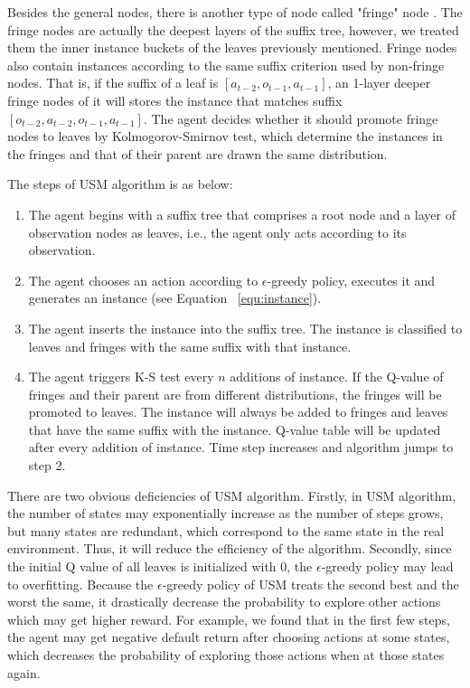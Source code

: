 \documentclass{article}
\begin{document}
Besides the general nodes, there is another type of node called "fringe" node \cite{mccallum1995instance}.
The fringe nodes are actually the deepest layers of the suffix tree, however, we treated them
the inner instance buckets of the leaves previously mentioned. Fringe nodes also contain
instances according to the same suffix criterion used by non-fringe nodes. That is, 
if the suffix of a leaf is $[a_{t-2}, o_{t-1}, a_{t-1}]$, an 1-layer deeper fringe nodes of it
will stores the instance that matches suffix $[o_{t-2}, a_{t-2}, o_{t-1}, a_{t-1}]$. The agent decides
whether it should promote fringe nodes to leaves by Kolmogorov-Smirnov test, which determine the
instances in the fringes and that of their parent are drawn the same distribution.

The steps of USM algorithm is as below:

\begin{enumerate}
  \item The agent begins with a suffix tree that comprises a root node and a layer of
  observation nodes as leaves, i.e., the agent only acts according to its observation.

  \item The agent chooses an action according to $\epsilon$-greedy policy, executes it and
  generates an instance (see Equation ~\ref{equ:instance}).

  \item The agent inserts the instance into the suffix tree. The instance is classified to
  leaves and fringes with the same suffix with that instance. 

  \item The agent triggers K-S test every $n$ additions of instance. If the Q-value of fringes
  and their parent are from different distributions, the fringes will be promoted to leaves.
  The instance will always be added to fringes and leaves that have the same suffix with the instance.
  Q-value table will be updated after every addition of instance. Time step increases and algorithm
  jumps to step 2.
\end{enumerate}

There are two obvious deficiencies of USM algorithm. Firstly, in USM algorithm,
the number of states may exponentially increase as the number of steps grows, but many
states are redundant, which correspond to the same state in the real environment. Thus, it
will reduce the efficiency of the algorithm. Secondly, since the initial Q value of all leaves
is initialized with 0, the $\epsilon$-greedy policy may lead to overfitting. Because
the $\epsilon$-greedy policy of USM treats the second best and the worst the same, it drastically
decrease the probability to explore other actions which may get higher reward. For example,
we found that in the first few steps, the agent may get negative default return after
choosing actions at some states, which decreases the probability of exploring those actions
when at those states again.
\end{document}
